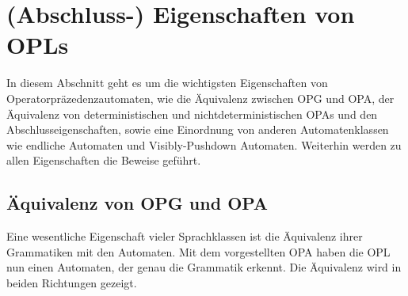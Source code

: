 \section{(Abschluss-) Eigenschaften von OPLs}
In diesem Abschnitt geht es um die wichtigsten Eigenschaften von Operatorpräzedenzautomaten, wie die Äquivalenz zwischen OPG und OPA, der Äquivalenz von deterministischen und nichtdeterministischen OPAs und den Abschlusseigenschaften, sowie eine Einordnung von anderen Automatenklassen wie endliche Automaten und Visibly-Pushdown Automaten. Weiterhin werden zu allen Eigenschaften die Beweise geführt.
\subsection{Äquivalenz von OPG und OPA}
Eine wesentliche Eigenschaft vieler Sprachklassen ist die Äquivalenz ihrer Grammatiken mit den Automaten. Mit dem vorgestellten OPA haben die OPL nun einen Automaten, der genau die Grammatik erkennt. Die Äquivalenz wird in beiden Richtungen gezeigt.

